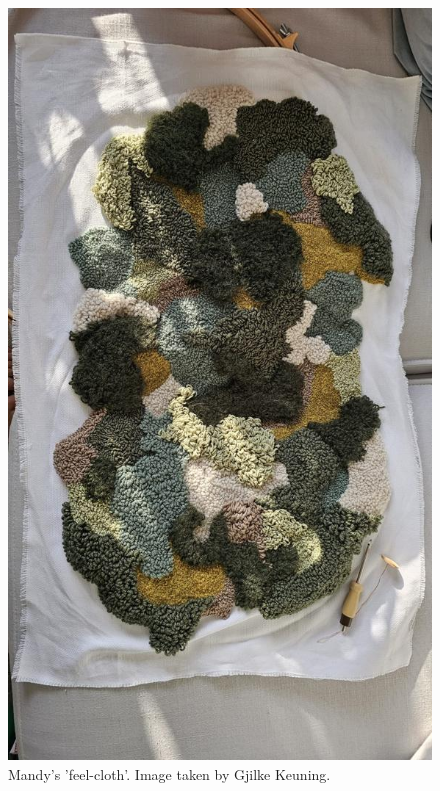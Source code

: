 \documentclass[authordate, empirical]{jote-new-article}
\begin{document}
	\begin{figure}
		\includegraphics[width=\linewidth]{media/fig+3.jpeg}

		\caption{Mandy's 'feel-cloth'. Image taken by Gjilke Keuning.}



	\end{figure}
\end{document}
